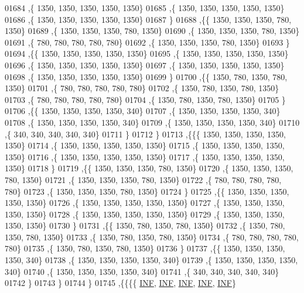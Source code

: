 \begin{DoxyCode}
01684    ,\{  1350,  1350,  1350,  1350,  1350\}
01685    ,\{  1350,  1350,  1350,  1350,  1350\}
01686    ,\{  1350,  1350,  1350,  1350,  1350\}
01687    \}
01688   ,\{\{  1350,  1350,  1350,   780,  1350\}
01689    ,\{  1350,  1350,  1350,   780,  1350\}
01690    ,\{  1350,  1350,  1350,   780,  1350\}
01691    ,\{   780,   780,   780,   780,   780\}
01692    ,\{  1350,  1350,  1350,   780,  1350\}
01693    \}
01694   ,\{\{  1350,  1350,  1350,  1350,  1350\}
01695    ,\{  1350,  1350,  1350,  1350,  1350\}
01696    ,\{  1350,  1350,  1350,  1350,  1350\}
01697    ,\{  1350,  1350,  1350,  1350,  1350\}
01698    ,\{  1350,  1350,  1350,  1350,  1350\}
01699    \}
01700   ,\{\{  1350,   780,  1350,   780,  1350\}
01701    ,\{   780,   780,   780,   780,   780\}
01702    ,\{  1350,   780,  1350,   780,  1350\}
01703    ,\{   780,   780,   780,   780,   780\}
01704    ,\{  1350,   780,  1350,   780,  1350\}
01705    \}
01706   ,\{\{  1350,  1350,  1350,  1350,   340\}
01707    ,\{  1350,  1350,  1350,  1350,   340\}
01708    ,\{  1350,  1350,  1350,  1350,   340\}
01709    ,\{  1350,  1350,  1350,  1350,   340\}
01710    ,\{   340,   340,   340,   340,   340\}
01711    \}
01712   \}
01713  ,\{\{\{  1350,  1350,  1350,  1350,  1350\}
01714    ,\{  1350,  1350,  1350,  1350,  1350\}
01715    ,\{  1350,  1350,  1350,  1350,  1350\}
01716    ,\{  1350,  1350,  1350,  1350,  1350\}
01717    ,\{  1350,  1350,  1350,  1350,  1350\}
01718    \}
01719   ,\{\{  1350,  1350,  1350,   780,  1350\}
01720    ,\{  1350,  1350,  1350,   780,  1350\}
01721    ,\{  1350,  1350,  1350,   780,  1350\}
01722    ,\{   780,   780,   780,   780,   780\}
01723    ,\{  1350,  1350,  1350,   780,  1350\}
01724    \}
01725   ,\{\{  1350,  1350,  1350,  1350,  1350\}
01726    ,\{  1350,  1350,  1350,  1350,  1350\}
01727    ,\{  1350,  1350,  1350,  1350,  1350\}
01728    ,\{  1350,  1350,  1350,  1350,  1350\}
01729    ,\{  1350,  1350,  1350,  1350,  1350\}
01730    \}
01731   ,\{\{  1350,   780,  1350,   780,  1350\}
01732    ,\{  1350,   780,  1350,   780,  1350\}
01733    ,\{  1350,   780,  1350,   780,  1350\}
01734    ,\{   780,   780,   780,   780,   780\}
01735    ,\{  1350,   780,  1350,   780,  1350\}
01736    \}
01737   ,\{\{  1350,  1350,  1350,  1350,   340\}
01738    ,\{  1350,  1350,  1350,  1350,   340\}
01739    ,\{  1350,  1350,  1350,  1350,   340\}
01740    ,\{  1350,  1350,  1350,  1350,   340\}
01741    ,\{   340,   340,   340,   340,   340\}
01742    \}
01743   \}
01744  \}
01745 ,\{\{\{\{   \mbox{\hyperlink{energy__const_8h_a12c2040f25d8e3a7b9e1c2024c618cb6}{INF}},   \mbox{\hyperlink{energy__const_8h_a12c2040f25d8e3a7b9e1c2024c618cb6}{INF}},   \mbox{\hyperlink{energy__const_8h_a12c2040f25d8e3a7b9e1c2024c618cb6}{INF}},   \mbox{\hyperlink{energy__const_8h_a12c2040f25d8e3a7b9e1c2024c618cb6}{INF}},   \mbox{\hyperlink{energy__const_8h_a12c2040f25d8e3a7b9e1c2024c618cb6}{INF}}\}

\end{DoxyCode}
